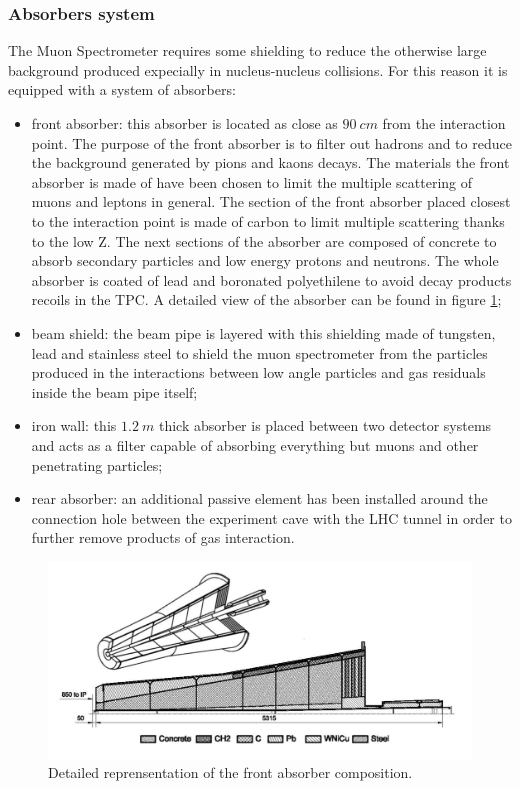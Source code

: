 \subsubsection{Absorbers system}
The Muon Spectrometer requires some shielding to reduce the otherwise large background produced expecially in nucleus-nucleus collisions.
For this reason it is equipped with a system of absorbers:
\begin{itemize}
    \item front absorber: this absorber is located as close as $90\ cm$ from the interaction point. The purpose of the front absorber is to filter out hadrons and to reduce the background generated by pions and kaons decays. The materials the front absorber is made of have been chosen to limit the multiple scattering of muons and leptons in general. The section of the front absorber placed closest to the interaction point is made of carbon to limit multiple scattering thanks to the low Z. The next sections of the absorber are composed of concrete to absorb secondary particles and low energy protons and neutrons. The whole absorber is coated of lead and boronated polyethilene to avoid decay products recoils in the TPC. A detailed view of the absorber can be found in figure \ref{fig:absorber};
    \item beam shield: the beam pipe is layered with this shielding made of tungsten, lead and stainless steel to shield the muon spectrometer from the particles produced in the interactions between low angle particles and gas residuals inside the beam pipe itself;
    \item iron wall: this $1.2\ m$ thick absorber is placed between two detector systems and acts as a filter capable of absorbing everything but muons and other penetrating particles;
    \item rear absorber: an additional passive element has been installed around the connection hole between the experiment cave with the LHC tunnel in order to further remove products of gas interaction.
\end{itemize}

\begin{figure}[!h]
\begin{center}
\includegraphics[width=0.7\linewidth]{Chapters/Introduction/Figs/absorber.png}
\caption{Detailed reprensentation of the front absorber composition.}
\label{fig:absorber}
\end{center}
\end{figure}


